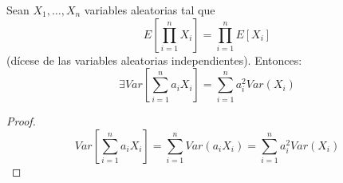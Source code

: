 \begin{coro}
    Sean $X_1,\dots,X_n$ variables aleatorias tal que $$E\left[\prod_{i=1}^n X_i\right]=\prod_{i=1}^nE[X_i]$$ (dícese de las variables aleatorias independientes). Entonces:
    \begin{equation*}
        \exists  Var\left[\sum_{i=1}^n a_iX_i\right] = \sum_{i=1}^n a_i^2 Var(X_i)
    \end{equation*}
\end{coro}
\begin{proof}
    \begin{equation*}
        Var\left[\sum_{i=1}^n a_iX_i\right]
        = \sum_{i=1}^n Var(a_iX_i)
        = \sum_{i=1}^n a_i^2 Var(X_i)
    \end{equation*}
\end{proof}


